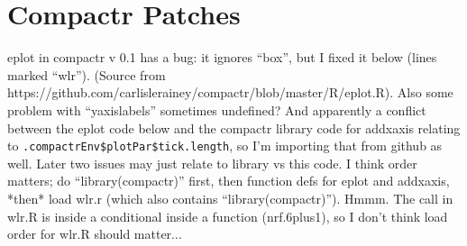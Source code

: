 \documentclass{article}\usepackage[]{graphicx}\usepackage[]{color}
\begin{document}
\section{Compactr Patches}
\label{sec:patches}
eplot in compactr v 0.1 has a bug: it ignores ``box'', but I fixed it below (lines marked ``wlr'').  (Source from https://github.com/carlislerainey/compactr/blob/master/R/eplot.R).  Also some problem with ``yaxislabels'' sometimes undefined?  And apparently a conflict between the eplot code below and the compactr library code for addxaxis relating to \verb|.compactrEnv$plotPar$tick.length|, so I'm importing that from github as well.  Later two issues may just relate to library vs this code.  I think order matters; do ``library(compactr)'' first, then function defs for eplot and addxaxis, *then* load wlr.r (which also contains ``library(compactr)'').  Hmmm.  The call in wlr.R is inside a conditional inside a function (nrf.6plus1), so I don't think load order for wlr.R should matter...
\end{document}

